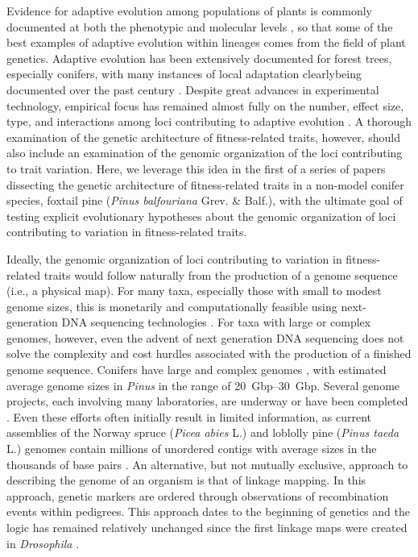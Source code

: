 \documentclass[11pt]{article}
\begin{document}
Evidence for adaptive evolution among populations of plants is commonly documented at both the phenotypic 
and molecular levels \citep{Kawecki:2004, Pannell:2013}, so that some of the best
examples of adaptive evolution within lineages comes from the field of plant genetics.
Adaptive evolution has been extensively documented for forest trees, especially conifers, with many instances of 
local adaptation clearlybeing documented over the past century \citep{White:2007, Neale:2011}. Despite great advances 
in experimental technology, empirical focus has remained almost fully on the number, effect size, type, and interactions 
among loci contributing to adaptive evolution \citep{Neale:2011, Alberto:2013}.  A thorough examination of the 
genetic architecture of fitness-related traits, however, should also include 
an examination of the genomic organization of the loci contributing to trait variation. Here, we leverage 
this idea in the first of a series of papers dissecting the genetic architecture of fitness-related 
traits in a non-model conifer species, foxtail pine (\textit{Pinus balfouriana} Grev. \& Balf.), with the 
ultimate goal of testing explicit evolutionary hypotheses about the genomic organization of loci 
contributing to variation in fitness-related traits.

Ideally, the genomic organization of loci contributing to variation in fitness-related traits would follow 
naturally from the production of a genome sequence (i.e., a physical map). For many taxa, especially those with 
small to modest genome sizes, this is monetarily and computationally feasible using next-generation DNA sequencing 
technologies \citep{Koboldt:2013}. For taxa with large or complex genomes, however, even the advent of next generation DNA 
sequencing does not solve the complexity and cost hurdles associated with the production of a finished genome sequence. Conifers 
have large and complex genomes \citep{Murray:1998, Ahuja:2005}, with estimated average genome sizes in \textit{Pinus} in the 
range of \SIrange{20}{30}{Gbp}. Several genome projects, each involving many laboratories, are underway or have been 
completed \citep{Mackay:2012}. Even these efforts often initially result in limited information, 
as current assemblies of the Norway spruce (\textit{Picea abies} L.) and loblolly pine (\textit{Pinus taeda} L.) genomes 
contain millions of unordered contigs with average sizes in the thousands of base pairs \citep{Nystedt:2013}. An alternative, 
but not mutually exclusive, approach to describing the genome of an organism 
is that of linkage mapping. In this approach, genetic markers are ordered through observations of recombination events 
within pedigrees. This approach dates to the beginning of genetics and the logic has remained relatively unchanged 
since the first linkage maps were created in \textit{Drosophila} \citep{Sturtevant:1913}.
\end{document}
